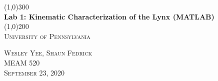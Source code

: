 \documentclass[12pt]{article}
\begin{document}
\begin{titlepage}
	\begin{center}
	\line(1,0){300}\\
	[0.25in]
	\huge{\bfseries Lab 1: Kinematic Characterization of the Lynx (MATLAB)}\\
	[0.12in]
	\line(1,0){200}\\
	[1cm]
	\textsc{\Large University of Pennsylvania}\\
	\end{center}
	\vfill
	\begin{flushright}
	\textsc{\large Wesley Yee, Shaun Fedrick\\
	MEAM 520\\
	September 23, 2020\\}
	\end{flushright}
\end{titlepage}
\end{document}

